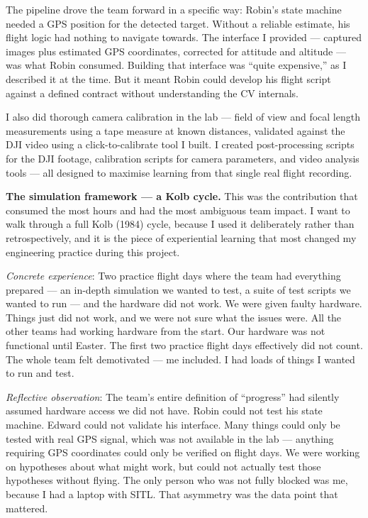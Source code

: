 The pipeline drove the team forward in a specific way: Robin's state machine needed a GPS position for the detected target. Without a reliable estimate, his flight logic had nothing to navigate towards. The interface I provided --- captured images plus estimated GPS coordinates, corrected for attitude and altitude --- was what Robin consumed. Building that interface was ``quite expensive,'' as I described it at the time. But it meant Robin could develop his flight script against a defined contract without understanding the CV internals.

I also did thorough camera calibration in the lab --- field of view and focal length measurements using a tape measure at known distances, validated against the DJI video using a click-to-calibrate tool I built. I created post-processing scripts for the DJI footage, calibration scripts for camera parameters, and video analysis tools --- all designed to maximise learning from that single real flight recording.

\textbf{The simulation framework --- a Kolb cycle.} This was the contribution that consumed the most hours and had the most ambiguous team impact. I want to walk through a full Kolb (1984) cycle, because I used it deliberately rather than retrospectively, and it is the piece of experiential learning that most changed my engineering practice during this project.

\textit{Concrete experience}: Two practice flight days where the team had everything prepared --- an in-depth simulation we wanted to test, a suite of test scripts we wanted to run --- and the hardware did not work. We were given faulty hardware. Things just did not work, and we were not sure what the issues were. All the other teams had working hardware from the start. Our hardware was not functional until Easter. The first two practice flight days effectively did not count. The whole team felt demotivated --- me included. I had loads of things I wanted to run and test.

\textit{Reflective observation}: The team's entire definition of ``progress'' had silently assumed hardware access we did not have. Robin could not test his state machine. Edward could not validate his interface. Many things could only be tested with real GPS signal, which was not available in the lab --- anything requiring GPS coordinates could only be verified on flight days. We were working on hypotheses about what might work, but could not actually test those hypotheses without flying. The only person who was not fully blocked was me, because I had a laptop with SITL. That asymmetry was the data point that mattered.

